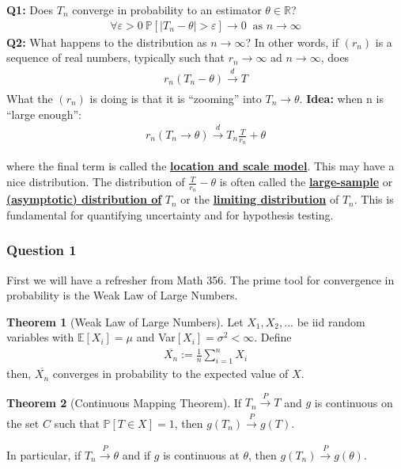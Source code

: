 \documentclass[11pt]{scrartcl}
\newcommand{\R}[0]{\mathbb{R}}
\theoremstyle{definition}
\newtheorem{theorem}{Theorem}
\theoremstyle{remark}
\newcommand{\dfn}[1]{\textbf{\underline{#1}}}
\newcommand{\pr}[1]{\mathbb{P}[#1]}
\newcommand{\EX}[1]{\mathbb{E}\left[#1 \right]}
\begin{document}
\begin{center}
	\textbf{Q1:} Does $T_n$ converge in probability to an estimator $\theta \in \R$? 
	\begin{align}
			\forall \varepsilon > 0\ \pr{ | T_n - \theta | > \varepsilon } \rightarrow 0\ \text{ as } n \rightarrow \infty 
	\end{align} 
	\textbf{Q2:} What happens to the distribution as $n \rightarrow \infty$? In other words, if $(r_n)$ is a sequence of real numbers, typically such that $r_n \rightarrow \infty$ ad $n \rightarrow \infty$, does
	\begin{align} 
			r_n ( T_n - \theta) \xrightarrow[]{d} T
	\end{align}
	What the $(r_n)$ is doing is that it is ``zooming'' into $T_n \rightarrow \theta$.  
	\textbf{Idea:}  when n is ``large enough'': 
	\begin{align*} 
		r_n(T_n \rightarrow \theta) \xrightarrow[]{d} T_n \frac{T}{r_n} + \theta 
	\end{align*}
\end{center}
where the final term is called the \dfn{location and scale model}. This may have a nice distribution. The distribution of $\frac{T}{r_n} - \theta$ is often called the \dfn{large-sample} or \dfn{(asymptotic) distribution of} $T_n$ or the \dfn{limiting distribution} of $T_n$. This is fundamental for quantifying uncertainty and for hypothesis testing. 

\subsubsection{Question 1}

First we will have a refresher from Math 356. The prime tool for convergence in probability is the Weak Law of Large Numbers. 

\begin{theorem}[Weak Law of Large Numbers] 
	Let $X_1, X_2, ...$ be iid random variables with $\EX{X_i} = \mu$ and Var$[X_i] = \sigma^2 < \infty$. Define 
	\begin{align}
		\overline{X_n} :=  \frac{1}{n} \sum_{i=1}^n X_i
	\end{align}
	then, $\overline{X_n}$ converges in probability to the expected value of $X$. 
\end{theorem}

\begin{theorem}[Continuous Mapping Theorem]
	If $T_n \xrightarrow[]{P} T$ and $g$ is continuous on the set $C$ such that $\pr{T \in X} =1$, then $g(T_n) \xrightarrow[]{P} g(T)$. 
\end{theorem}
	In particular, if $T_n \xrightarrow[]{P} \theta$ and if $g$ is continuous at $\theta$, then $g(T_n) \xrightarrow[]{P} g(\theta)$.
	
\end{document}
